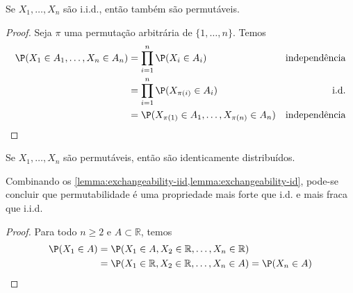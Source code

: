 \begin{lemma}
 \label{lemma:exchangeability-iid}
 Se $X_{1},\ldots,X_{n}$ são i.i.d.,
 então também são permutáveis.
\end{lemma}

\begin{proof}
 Seja $\pi$ uma permutação arbitrária de $\{1,\ldots,n\}$. 
 Temos
 \begin{align*}
  \P(X_{1} \in A_{1}, \ldots, X_{n} \in A_{n})
  &= \prod_{i=1}^{n}{\P(X_{i} \in A_{i})}
  & \text{independência} \\
  &= \prod_{i=1}^{n}{\P(X_{\pi(i)} \in A_{i})}
  &	\text{i.d.} \\
  &= \P(X_{\pi(1)} \in A_{1},\ldots,X_{\pi(n)} \in A_{n})
  & \text{independência}
 \end{align*}
\end{proof}

\begin{lemma}
 \label{lemma:exchangeability-id}
 Se $X_{1},\ldots,X_{n}$ são permutáveis, então 
 são identicamente distribuídos.
\end{lemma}

Combinando os \cref{lemma:exchangeability-iid,lemma:exchangeability-id},
pode-se concluir que permutabilidade é uma
propriedade mais forte que i.d. e mais fraca que
i.i.d.

\begin{proof}
 Para todo $n \geq 2$ e $A \subset \mathbb{R}$, temos
 \begin{align*}
  \P(X_{1} \in A)
  &= \P(X_{1} \in A, X_{2} \in \mathbb{R}, \ldots, X_{n} \in \mathbb{R}) \\
  &= \P(X_{1} \in \mathbb{R}, X_{2} \in \mathbb{R}, \ldots, X_{n} \in A) = \P(X_{n} \in A)
 \end{align*}
\end{proof}

